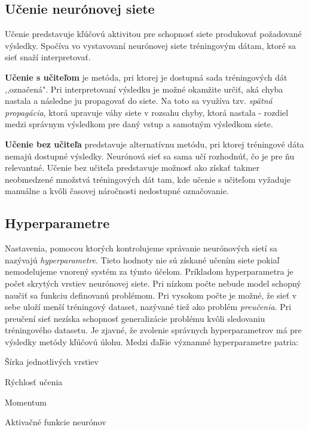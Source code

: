 \subsection{Učenie neurónovej siete}
\label{analyza_ucenie_nn}

Učenie predstavuje kľúčovú aktivitou pre schopnosť siete produkovať požadované výsledky. Spočíva vo vystavovaní neurónovej siete tréningovým dátam, ktoré sa sieť snaží interpretovať.

\textbf{Učenie s učiteľom} je metóda, pri ktorej je dostupná sada tréningových dát ,,označená". Pri interpretovaní výsledku je možné okamžite určiť, aká chyba nastala a následne ju propagovať do siete. Na toto sa využíva tzv. \textit{spätná propagácia}, ktorá upravuje váhy siete v rozsahu chyby, ktorá nastala - rozdiel medzi správnym výsledkom pre daný vstup a samotným výsledkom siete.
\noindent

\textbf{Učenie bez učiteľa} predstavuje alternatívnu metódu, pri ktorej tréningové dáta nemajú dostupné výsledky. Neurónová sieť sa sama učí rozhodnúť, čo je pre ňu relevantné. Učenie bez učiteľa predstavuje možnosť ako získať takmer neobmedzené množstvá tréningových dát tam, kde učenie s učiteľom vyžaduje manuálne a kvôli časovej náročnosti nedostupné označovanie.
\noindent

\subsection{Hyperparametre}
\label{analyza_hyperparametre}

Nastavenia, pomocou ktorých kontrolujeme správanie neurónových sietí sa nazývajú \textit{hyperparametre}. Tieto hodnoty nie sú získané učením siete pokiaľ nemodelujeme vnorený systém za týmto účelom. Príkladom hyperparametra je počet skrytých vrstiev neurónovej siete. Pri nízkom počte nebude model schopný naučiť sa funkciu definovanú problémom. Pri vysokom počte je možné, že sieť v sebe uloží menší tréningový dataset, nazývané tiež ako problém \textit{preučenia}. Pri preučení sieť nezíska schopnosť generalizácie problému kvôli sledovaniu tréningového datasetu. Je zjavné, že zvolenie správnych hyperparametrov má pre výsledky metódy kľúčovú úlohu. Medzi ďaľšie významné hyperparametre patria:
\begin{my_itemize}
	\item {Šírka jednotlivých vrstiev}
	\item {Rýchlosť učenia}
	\item {Momentum}
	\item {Aktivačné funkcie neurónov}
\end{my_itemize}


